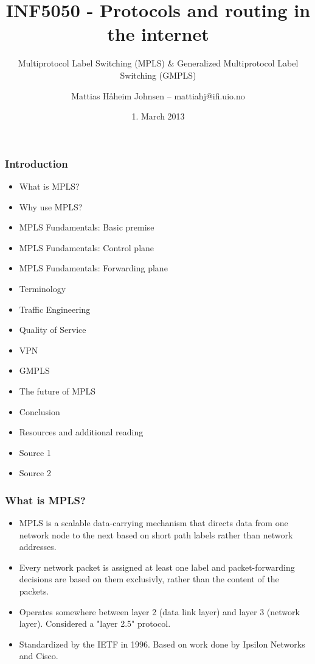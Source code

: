 \documentclass[12pt]{beamer}
\title[]{INF5050 - Protocols and routing in the internet}
\subtitle[]{Multiprotocol Label Switching (MPLS) & Generalized Multiprotocol Label Switching (GMPLS)}
\author{Mattias H{\aa}heim Johnsen -- mattiahj@ifi.uio.no}
\date{1. March 2013}
\begin{document}
\begin{frame}
  \titlepage
\end{frame}

\begin{frame}
  \frametitle{Introduction}
  \begin{itemize}
  \item What is MPLS?
  \item Why use MPLS?
  \item MPLS Fundamentals: Basic premise
  \item MPLS Fundamentals: Control plane
  \item MPLS Fundamentals: Forwarding plane
  \item Terminology
  \item Traffic Engineering
  \item Quality of Service
  \item VPN
  \item GMPLS
  \item The future of MPLS
  \item Conclusion
  \item Resources and additional reading
  \end{itemize}
  \begin{itemize}
  \item Source 1
  \item Source 2
  \end{itemize}
\end{frame}

\begin{frame}
  \frametitle{What is MPLS?}
	\begin{itemize}
	    \item MPLS is a scalable data-carrying mechanism that directs data from one network node to the next based on short path labels rather than network addresses.
        \item Every network packet is assigned at least one label and packet-forwarding decisions are based on them exclusivly, rather than the content of the packets.
        \item Operates somewhere between layer 2 (data link layer) and layer 3 (network layer). Considered a "layer 2.5" protocol.
        \item Standardized by the IETF in 1996. Based on work done by Ipsilon Networks and Cisco.
	\end{itemize}
\end{frame}
\end{document}
